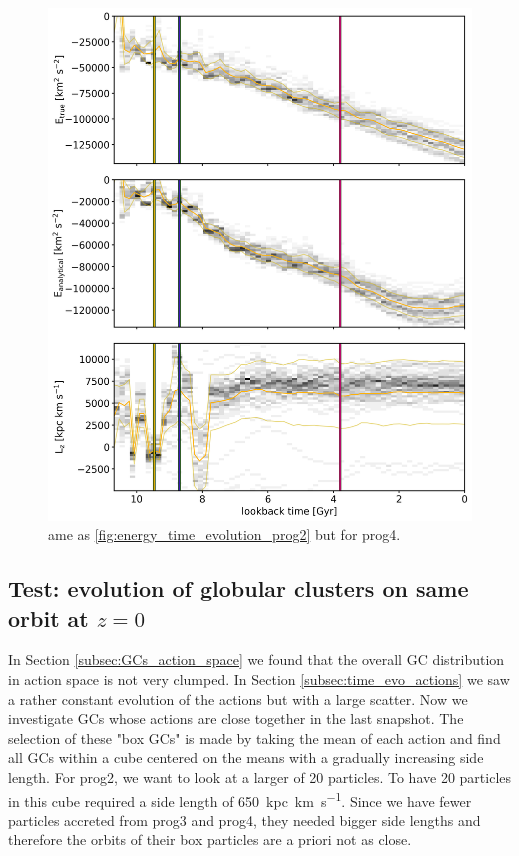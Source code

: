 \begin{figure}[htbp]
\captionsetup{format=plain}
    \centering
	\includegraphics[width=\textwidth]{plots/Dynamics/prog4/energy_time_evolution_hist_mean.png}
    \caption{ame as \ref{fig:energy_time_evolution_prog2} but for prog4.}\label{fig:energy_time_evolution_prog4}
\end{figure}
\fi

\subsection{Test: evolution of globular clusters on same orbit at $z=0$}\label{subsec:box_GCs}
In Section \ref{subsec:GCs_action_space} we found that the overall \ac{GC} distribution in action space is not very clumped. In Section \ref{subsec:time_evo_actions} we saw a rather constant evolution of the actions but with a large scatter. Now we investigate \acp{GC} whose actions are close together in the last snapshot. The selection of these "box \acp{GC}" is made by taking the mean of each action and find all \acp{GC} within a cube centered on the means with a gradually increasing side length. For prog2, we want to look at a larger of 20 particles. To have 20 particles in this cube required a side length of \SI{650}{kpc.km.s^{-1}}. Since we have fewer particles accreted from prog3 and prog4, they needed bigger side lengths and therefore the orbits of their box particles are a priori not as close.  



